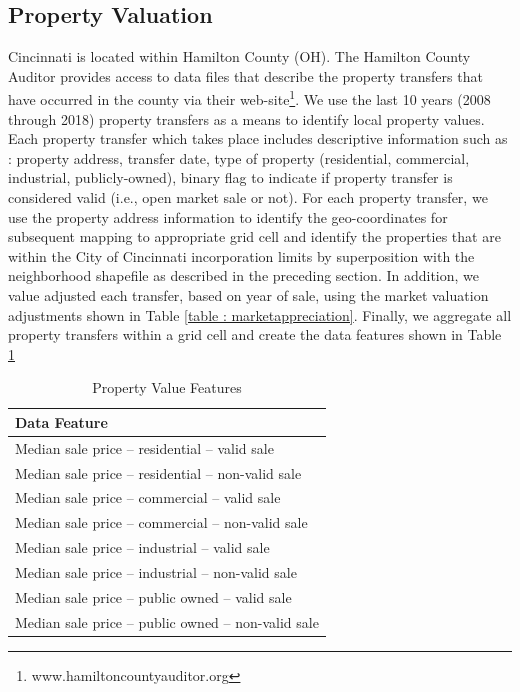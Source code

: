 \documentclass{llncs}
\begin{document}

\subsection{Property Valuation}

Cincinnati is located within Hamilton County (OH). The Hamilton County Auditor provides access to data files that describe the property transfers that have occurred in the county via their web-site\footnote{\label{hcauditor}www.hamiltoncountyauditor.org}. We use the last 10 years (2008 through 2018) property transfers as a means to identify local property values. Each property transfer which takes place includes descriptive information such as : property address, transfer date, type of property (residential, commercial, industrial, publicly-owned), binary flag to indicate if property transfer is considered valid (i.e., open market sale or not). For each property transfer, we use the property address information to identify the geo-coordinates for subsequent mapping to appropriate grid cell and identify the properties that are within the City of Cincinnati incorporation limits by superposition with the neighborhood shapefile as described in the preceding section. In addition, we value adjusted each transfer, based on year of sale, using the market valuation adjustments shown in Table  \ref{table : marketappreciation}. Finally, we aggregate all property transfers within a grid cell and create the data features shown in Table \ref{table : propertyValueFeatures} 


\FloatBarrier
\begin{table}[!h]
\begin{center}
\caption{Property Value Features}
\label{table : propertyValueFeatures}
\begin{tabular}{ p{}}
\hline
\rule{0pt}{12pt}
Data Feature	\\
\hline
Median sale price – residential – valid sale\\
Median sale price – residential – non-valid sale\\
Median sale price – commercial – valid sale\\
Median sale price – commercial – non-valid sale\\
Median sale price – industrial – valid sale\\
Median sale price – industrial – non-valid sale\\
Median sale price – public owned – valid sale\\
Median sale price – public owned – non-valid sale \\[2pt]
\hline
\end{tabular}
\end{center}
\end{table}
\FloatBarrier
%
\end{document}
